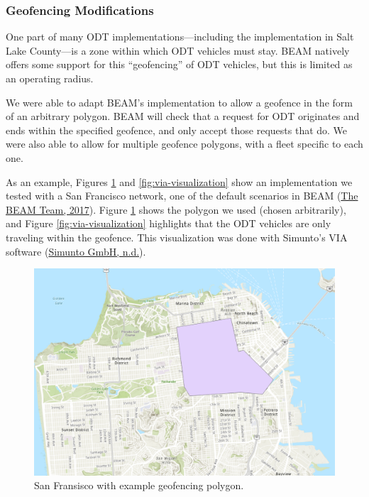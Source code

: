 \documentclass[
]{article}
\begin{document}
\hypertarget{geofencing-modifications}{%
\subsubsection{Geofencing Modifications}\label{geofencing-modifications}}

One part of many ODT implementations---including the implementation in Salt Lake County---is a zone within which ODT vehicles must stay. BEAM natively offers some support for this ``geofencing'' of ODT vehicles, but this is limited as an operating radius.

We were able to adapt BEAM's implementation to allow a geofence in the form of an arbitrary polygon. BEAM will check that a request for ODT originates and ends within the specified geofence, and only accept those requests that do. We were also able to allow for multiple geofence polygons, with a fleet specific to each one.

As an example, Figures \ref{fig:sanfran-polygon} and \ref{fig:via-visualization} show an implementation we tested with a San Francisco network, one of the default scenarios in BEAM (\protect\hyperlink{ref-beamdocs}{The BEAM Team, 2017}). Figure \ref{fig:sanfran-polygon} shows the polygon we used (chosen arbitrarily), and Figure \ref{fig:via-visualization} highlights that the ODT vehicles are only traveling within the geofence. This visualization was done with Simunto's VIA software (\protect\hyperlink{ref-SimuntoVIA}{Simunto GmbH, n.d.}).

\begin{figure}
\includegraphics[width=14.44in]{image/san_fransisco_polygon_example} \caption{San Fransisco with example geofencing polygon.}\label{fig:sanfran-polygon}
\end{figure}
\end{document}

